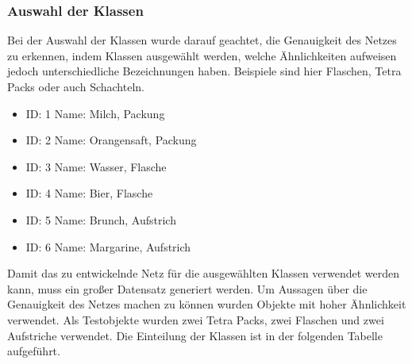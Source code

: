 \documentclass[a4paper,12pt,oneside]{article}
\begin{document}
  \subsubsection{Auswahl der Klassen} 
Bei der Auswahl der Klassen wurde darauf geachtet, die Genauigkeit des Netzes zu erkennen, indem Klassen ausgewählt werden, welche Ähnlichkeiten aufweisen jedoch unterschiedliche Bezeichnungen haben. Beispiele sind hier Flaschen, Tetra Packs oder auch Schachteln.

\vspace{0.5 cm}

\begin{itemize}
\label{tab:klassen1}

\item ID: 1 Name: \glqq Milch, Packung\grqq

\item ID: 2 Name: \glqq Orangensaft, Packung\grqq

\item ID: 3 Name: \glqq Wasser, Flasche\grqq

\item ID: 4 Name: \glqq Bier, Flasche\grqq

\item ID: 5 Name: \glqq Brunch, Aufstrich\grqq

\item ID: 6 Name: \glqq Margarine, Aufstrich\grqq

\end{itemize}
  

Damit das zu entwickelnde Netz für die ausgewählten Klassen verwendet werden kann, muss ein großer Datensatz generiert werden. Um Aussagen über die Genauigkeit des Netzes machen zu können wurden Objekte mit hoher Ähnlichkeit verwendet. Als Testobjekte wurden zwei Tetra Packs, zwei Flaschen und zwei Aufstriche verwendet. Die Einteilung der Klassen ist in der folgenden Tabelle aufgeführt.
\\
\\
\end{document}
